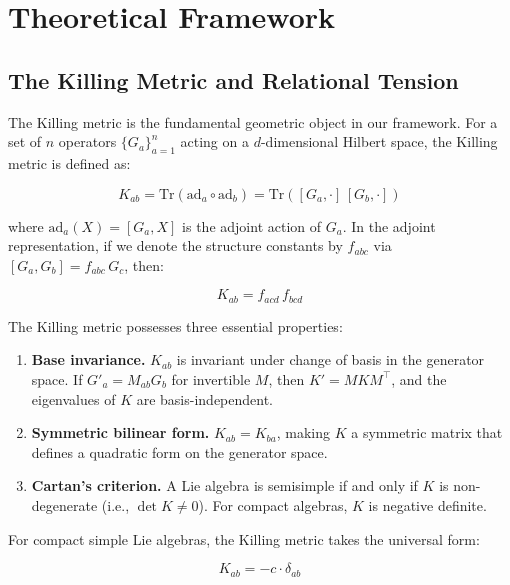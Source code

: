 \section{Theoretical Framework}\label{sec:variational_principle}

\subsection{The Killing Metric and Relational Tension}\label{sec:killing_metric}

The Killing metric is the fundamental geometric object in our framework. For a set of $n$ operators $\{G_a\}_{a=1}^n$ acting on a $d$-dimensional Hilbert space, the Killing metric is defined as:

\begin{equation}
K_{ab} = \mathrm{Tr}(\mathrm{ad}_a \circ \mathrm{ad}_b) = \mathrm{Tr}([G_a, \cdot]\,[G_b, \cdot])
\end{equation}

where $\mathrm{ad}_a(X) = [G_a, X]$ is the adjoint action of $G_a$. In the adjoint representation, if we denote the structure constants by $f_{abc}$ via $[G_a, G_b] = f_{abc}\,G_c$, then:

\begin{equation}
K_{ab} = f_{acd}\,f_{bcd}
\end{equation}

The Killing metric possesses three essential properties:

\begin{enumerate}[label=\roman*.]
\item \textbf{Base invariance.} $K_{ab}$ is invariant under change of basis in the generator space. If $G'_a = M_{ab}G_b$ for invertible $M$, then $K' = M K M^\top$, and the eigenvalues of $K$ are basis-independent.

\item \textbf{Symmetric bilinear form.} $K_{ab} = K_{ba}$, making $K$ a symmetric matrix that defines a quadratic form on the generator space.

\item \textbf{Cartan's criterion.} A Lie algebra is semisimple if and only if $K$ is non-degenerate (i.e., $\det K \neq 0$). For compact algebras, $K$ is negative definite.
\end{enumerate}

For compact simple Lie algebras, the Killing metric takes the universal form:

\begin{equation}
K_{ab} = -c \cdot \delta_{ab}
\end{equation}


